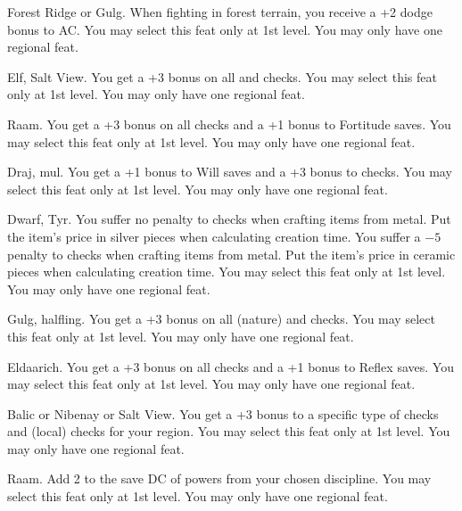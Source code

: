 {}
{Forest Ridge or Gulg.}
{When fighting in forest terrain, you receive a +2 dodge bonus to AC.}
{}
{You may select this feat only at 1st level. You may only have one regional feat.}

{}
{Elf, Salt View.}
{You get a +3 bonus on all  and  checks.}
{}
{You may select this feat only at 1st level. You may only have one regional feat.}

{}
{Raam.}
{You get a +3 bonus on all  checks and a +1 bonus to Fortitude saves.}
{}
{You may select this feat only at 1st level. You may only have one regional feat.}

{}
{Draj, mul.}
{You get a +1 bonus to Will saves and a +3 bonus to  checks.}
{}
{You may select this feat only at 1st level. You may only have one regional feat.}

{}
{Dwarf, Tyr.}
{You suffer no penalty to  checks when crafting items from metal. Put the item's price in silver pieces when calculating creation time.}
{You suffer a $-5$ penalty to  checks when crafting items from metal. Put the item's price in ceramic pieces when calculating creation time.}
{You may select this feat only at 1st level. You may only have one regional feat.}

{}
{Gulg, halfling.}
{You get a +3 bonus on all  (nature) and  checks.}
{}
{You may select this feat only at 1st level. You may only have one regional feat.}

{}
{Eldaarich.}
{You get a +3 bonus on all  checks and a +1 bonus to Reflex saves.}
{}
{You may select this feat only at 1st level. You may only have one regional feat.}

{}
{Balic or Nibenay or Salt View.}
{You get a +3 bonus to a specific type of  checks and  (local) checks for your region.}
{}
{You may select this feat only at 1st level. You may only have one regional feat.}

{}
{Raam.}
{Add 2 to the save DC of powers from your chosen discipline.}
{}
{You may select this feat only at 1st level. You may only have one regional feat.}